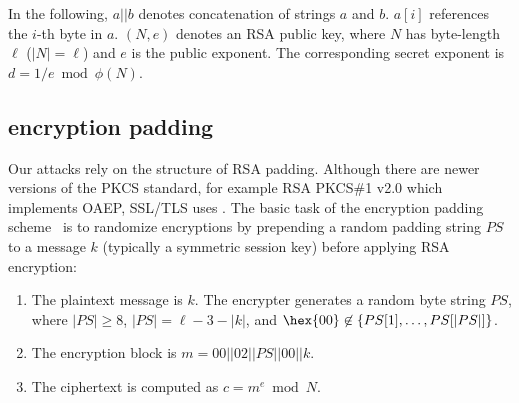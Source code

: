%

In the following, $a||b$ denotes concatenation of strings $a$ and
$b$. $a{[i]}$ references the $i$-th byte in $a$.
$(N,e)$ denotes an RSA public key, where $N$ has byte-length
$\ell$ ($|N|=\ell$) and $e$ is the public exponent. The corresponding
secret exponent is $d = 1/e \bmod \phi(N)$.

\subsection{\PKCS encryption padding}
\label{sec:PKCSdescr}

Our attacks rely on the structure of RSA \PKCS padding.  Although there are newer versions of the PKCS standard,
for example RSA PKCS\#1 v2.0 which implements OAEP, SSL/TLS uses \PKCS.
The basic task of the \PKCS encryption padding scheme~\cite{rfc2313}
is to randomize encryptions by prepending a random padding string $PS$
to a message $k$ (typically a symmetric session key) before applying
RSA encryption:

\begin{enumerate} 
	\item The plaintext message is $k$. The encrypter generates a random byte
	string $PS$, where $|PS| \geq 8$, $|PS|=\ell-3-|k|$, and $\hex{00} \not \in \{PS{[1]}, \ldots,PS{[|PS|]}\}$. 
	\item The encryption block is $m = 00||02||PS||00||k$. 
	\item The ciphertext is computed as $c = m^e \bmod N$. 
\end{enumerate} 

